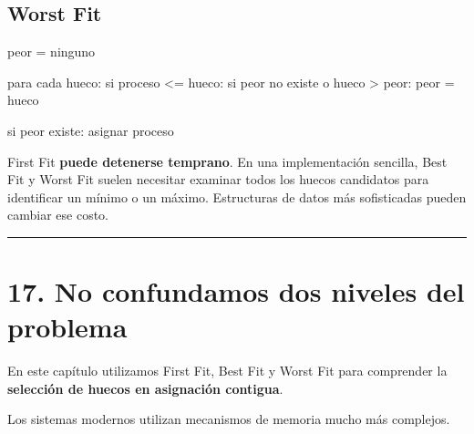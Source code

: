 \documentclass[
  spanish,
  letterpaper,
]{scrbook}
\newenvironment{Shaded}{\begin{snugshade}}{\end{snugshade}}
\newcommand{\NormalTok}[1]{\textcolor[rgb]{0.00,0.23,0.31}{#1}}
\begin{document}
\section{Worst Fit}\label{worst-fit-1}

\begin{Shaded}
\begin{Highlighting}[]
\NormalTok{peor = ninguno}

\NormalTok{para cada hueco:}
\NormalTok{    si proceso \textless{}= hueco:}
\NormalTok{        si peor no existe}
\NormalTok{           o hueco \textgreater{} peor:}
\NormalTok{            peor = hueco}

\NormalTok{si peor existe:}
\NormalTok{    asignar proceso}
\end{Highlighting}
\end{Shaded}

\begin{tcolorbox}[enhanced jigsaw, arc=.35mm, bottomrule=.15mm, bottomtitle=1mm, breakable, colback=white, colbacktitle=quarto-callout-note-color!10!white, colframe=quarto-callout-note-color-frame, coltitle=black, left=2mm, leftrule=.75mm, opacityback=0, opacitybacktitle=0.6, rightrule=.15mm, title=\textcolor{quarto-callout-note-color}{\faInfo}\hspace{0.5em}{Observe el costo de búsqueda}, titlerule=0mm, toprule=.15mm, toptitle=1mm]

First Fit \textbf{puede detenerse temprano}. En una implementación
sencilla, Best Fit y Worst Fit suelen necesitar examinar todos los
huecos candidatos para identificar un mínimo o un máximo. Estructuras de
datos más sofisticadas pueden cambiar ese costo.

\end{tcolorbox}

\begin{center}\rule{0.5\linewidth}{0.5pt}\end{center}


\chapter{17. No confundamos dos niveles del
problema}\label{no-confundamos-dos-niveles-del-problema}

En este capítulo utilizamos First Fit, Best Fit y Worst Fit para
comprender la \textbf{selección de huecos en asignación contigua}.

Los sistemas modernos utilizan mecanismos de memoria mucho más
complejos.
\end{document}
